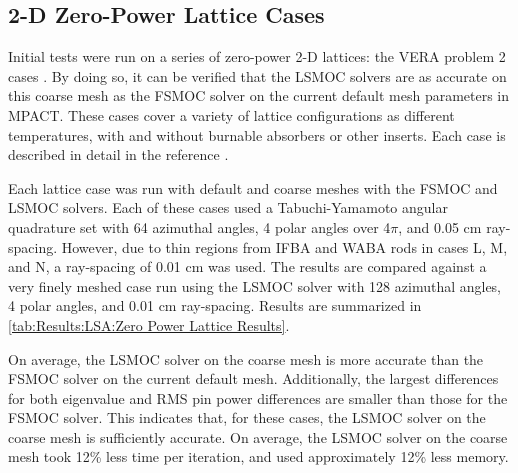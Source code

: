 {{        \subsection{2-D Zero-Power Lattice Cases}{\label{ssec:Results:LSA:2-D Zero-Power Lattice Cases}
            Initial tests were run on a series of zero-power 2-D lattices: the \ac{VERA} problem 2 cases \cite{VERAProblems}.
            By doing so, it can be verified that the \ac{LSMOC} solvers are as accurate on this coarse mesh as the \ac{FSMOC} solver on the current default mesh parameters in MPACT.
            These cases cover a variety of lattice configurations as different temperatures, with and without burnable absorbers or other inserts.
            Each case is described in detail in the reference \cite{VERAProblems}.

            Each lattice case was run with default and coarse meshes with the \ac{FSMOC} and \ac{LSMOC} solvers.
            Each of these cases used a Tabuchi-Yamamoto angular quadrature set \cite{TabuchiYamamotoQuad} with 64 azimuthal angles, 4 polar angles over 4$\pi$, and 0.05 cm ray-spacing.
            However, due to thin regions from IFBA and WABA rods in cases L, M, and N, a ray-spacing of 0.01 cm was used.
            The results are compared against a very finely meshed case run using the \ac{LSMOC} solver with 128 azimuthal angles, 4 polar angles, and 0.01 cm ray-spacing.
            Results are summarized in \cref{tab:Results:LSA:Zero Power Lattice Results}.

            On average, the \ac{LSMOC} solver on the coarse mesh is more accurate than the \ac{FSMOC} solver on the current default mesh.
            Additionally, the largest differences for both eigenvalue and RMS pin power differences are smaller than those for the \ac{FSMOC} solver.
            This indicates that, for these cases, the \ac{LSMOC} solver on the coarse mesh is sufficiently accurate.
            On average, the \ac{LSMOC} solver on the coarse mesh took 12\% less time per iteration, and used approximately 12\% less memory.

}}}
